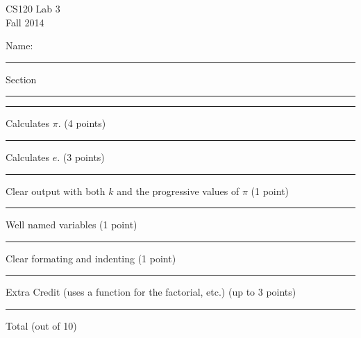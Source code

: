 \documentclass[12pt,openbib]{article}
\begin{document}
\thispagestyle{empty}
\vspace{-1.0in}
\large
\begin{center}
\textsf{CS120  Lab 3}\\
\textsf{Fall 2014}
\end{center}
\vspace{-0.2in}
\large\textsf{Name: }\rule[-0.01in]{2.5in}{0.015in}
\hspace{0.5in} Section \rule[-0.01in]{1.0in}{0.015in}

\normalsize
\rm
\vspace{0.5in}

 
\rule[-0.01in]{0.5in}{0.015in} Calculates $\pi$. (4 points)

\rule[-0.01in]{0.5in}{0.015in} Calculates $e$. (3 points)

\rule[-0.01in]{0.5in}{0.015in} Clear output with both $k$ and the progressive values of $\pi$ (1 point)

\rule[-0.01in]{0.5in}{0.015in} Well named variables (1 point)

\rule[-0.01in]{0.5in}{0.015in} Clear formating and indenting (1 point)

\rule[-0.01in]{0.5in}{0.015in} Extra Credit (uses a function for the factorial, etc.) (up to 3 points)

\rule[-0.01in]{0.5in}{0.015in} Total (out of 10)
\end{document}
